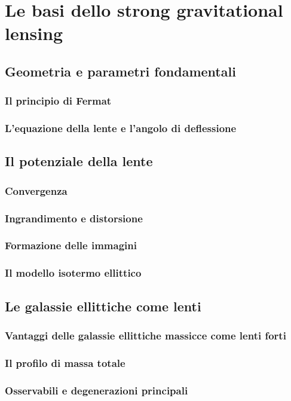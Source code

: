 \chapter{Le basi dello strong gravitational lensing}
\label{cap:SGL}

\section{Geometria e parametri fondamentali}
\subsection{Il principio di Fermat}
\subsection{L'equazione della lente e l'angolo di deflessione}

\section{Il potenziale della lente}
\subsection{Convergenza}
\subsection{Ingrandimento e distorsione}
\subsection{Formazione delle immagini}
\subsection{Il modello isotermo ellittico}

\section{Le galassie ellittiche come lenti}
\subsection{Vantaggi delle galassie ellittiche massicce come lenti forti}
\subsection{Il profilo di massa totale}
\subsection{Osservabili e degenerazioni principali}
